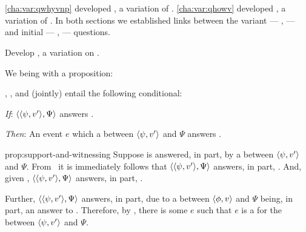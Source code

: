 \section{\issueConstraint{}}
\label{cha:var:issue}

\begin{note}
  \autoref{cha:var:qwhyvnp} developed \qWhyV{}, a variation of \qWhy{}.
  \autoref{cha:var:qhowv} developed \qHowV{}, a variation of \qHow{}.
  In both sections we established links between the variant --- \qWhyV{}, \qHowV{}  --- and initial --- \qWhy{}, \qHow{} --- questions.

  Develop \issueConstraint{}, a variation on \issueInclusion{}.
\end{note}

\begin{note}
 We being with a proposition:

  \begin{proposition}[\qWhyV{}-\qWhy{}-\qHow{}-\qHowV{}]%
    \label{prop:support-and-witnessing}%
      \linkW{}, \linkH{}, and \issueInclusion{} (jointly) entail the following conditional:
      \begin{itenum}
      \item[\emph{If}:]
      \(\langle \langle \psi, v' \rangle, \Psi \rangle\) answers \qWhyV{}.
      \item[\emph{Then}:]
        An event \(e\) which  a \ros{} between \(\langle \psi, v' \rangle\) and \(\Psi\) answers \qHowV{}.
      \end{itenum}
    \vspace{-\baselineskip}
  \end{proposition}

  \begin{argument}{prop:support-and-witnessing}
    Suppose \qWhyV{} is answered, in part, by a \ros{} between \(\langle \psi, v' \rangle\) and \(\Psi\).
    From~\linkW{} it is immediately follows that \(\langle \langle \psi, v' \rangle, \Psi \rangle\) answers, in part, \qWhy{}.
    And, given \issueInclusion{}, \(\langle \langle \psi, v' \rangle, \Psi \rangle\) answers, in part, \qHow{}.

    Further, \(\langle \langle \psi, v' \rangle, \Psi \rangle\) answers, in part, \qHow{} due to a \ros{} between \(\langle \phi, v \rangle\) and \(\Psi\) being, in part, an answer to \qWhyV{}.
    Therefore, by \linkH{}, there is some \(e\) such that \(e\) is a  for the \ros{} between \(\langle \psi, v' \rangle\) and \(\Psi\).
  \end{argument}
\end{note}


